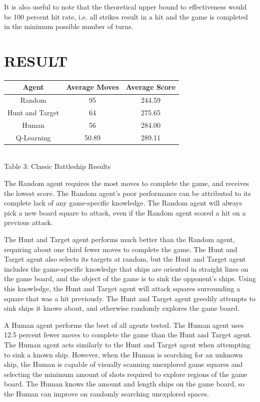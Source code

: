 \documentclass{article}
\begin{document}
\begin{multicols}{2}
\begin{itemize}
\end{itemize}
It is also useful to note that the theoretical upper bound to effectiveness would be 100 percent hit rate, i.e. all strikes result in a hit and the game is completed in the minimum possible number of turns. 
\section{RESULT}

\begin{center}
\begin{tabular}{|c | c| c|} 
 \hline
 \textbf{Agent} & \textbf{Average
  Moves}& \textbf{Average Score}\\ [0.5ex] 
 \hline
Random & 95 & 244.59 \\ \hline
Hunt and Target & 64 & 275.65 \\ \hline
Human & 56 & 284.00 \\ \hline
Q-Learning & 50.89 & 289.11 \\ \hline
 \hline 
\end{tabular}
\\[1.5ex]Table 3: Classic Battleship Results
\end{center}
The Random agent requires the most moves to complete the game, and receives the lowest score.  The Random agent’s poor performance can be attributed to its complete lack of any game-specific knowledge.  The Random agent will always pick a new board square to attack, even if the Random agent scored a hit on a previous attack.

The Hunt and Target agent performs much better than the Random agent, requiring about one third fewer moves to complete the game.  The Hunt and Target agent also selects its targets at random, but the Hunt and Target agent includes the game-specific knowledge that ships are oriented in straight lines on the game board, and the object of the game is to sink the opponent’s ships.  Using this knowledge, the Hunt and Target agent will attack squares surrounding a square that was a hit previously.  The Hunt and Target agent greedily attempts to sink ships it knows about, and otherwise randomly explores the game board.

A Human agent performs the best of all agents tested.  The Human agent uses 12.5 percent fewer moves to complete the game than the Hunt and Target agent.  The Human agent acts similarly to the Hunt and Target agent when attempting to sink a known ship.  However, when the Human is searching for an unknown ship, the Human is capable of visually scanning unexplored game squares and selecting the minimum amount of shots required to explore regions of the game board.  The Human knows the amount and length ships on the game board, so the Human can improve on randomly searching unexplored spaces.


\end{multicols}
\end{document}
